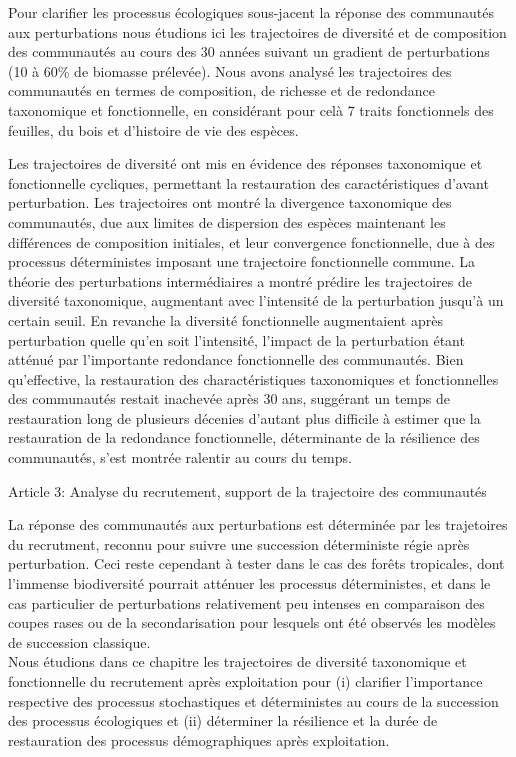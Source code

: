 \documentclass[
  11pt,
  french,
  A4paper,
  extrafontsizes,onecolumn,openright
  ]{memoir}
\begin{document}
Pour clarifier les processus écologiques sous-jacent la réponse des
communautés aux perturbations nous étudions ici les trajectoires de
diversité et de composition des communautés au cours des 30 années
suivant un gradient de perturbations (10 à 60\% de biomasse prélevée).
Nous avons analysé les trajectoires des communautés en termes de
composition, de richesse et de redondance taxonomique et fonctionnelle,
en considérant pour celà 7 traits fonctionnels des feuilles, du bois et
d'histoire de vie des espèces.

Les trajectoires de diversité ont mis en évidence des réponses
taxonomique et fonctionnelle cycliques, permettant la restauration des
caractéristiques d'avant perturbation. Les trajectoires ont montré la
divergence taxonomique des communautés, due aux limites de dispersion
des espèces maintenant les différences de composition initiales, et leur
convergence fonctionnelle, due à des processus déterministes imposant
une trajectoire fonctionnelle commune. La théorie des perturbations
intermédiaires a montré prédire les trajectoires de diversité
taxonomique, augmentant avec l'intensité de la perturbation jusqu'à un
certain seuil. En revanche la diversité fonctionnelle augmentaient après
perturbation quelle qu'en soit l'intensité, l'impact de la perturbation
étant atténué par l'importante redondance fonctionnelle des communautés.
Bien qu'effective, la restauration des charactéristiques taxonomiques et
fonctionnelles des communautés restait inachevée après 30 ans, suggérant
un temps de restauration long de plusieurs décenies d'autant plus
difficile à estimer que la restauration de la redondance fonctionnelle,
déterminante de la résilience des communautés, s'est montrée ralentir au
cours du temps.

Article 3: Analyse du recrutement, support de la trajectoire des
communautés

La réponse des communautés aux perturbations est déterminée par les
trajetoires du recrutment, reconnu pour suivre une succession
déterministe régie après perturbation. Ceci reste cependant à tester
dans le cas des forêts tropicales, dont l'immense biodiversité pourrait
atténuer les processus déterministes, et dans le cas particulier de
perturbations relativement peu intenses en comparaison des coupes rases
ou de la secondarisation pour lesquels ont été observés les modèles de
succession classique.\\
Nous étudions dans ce chapitre les trajectoires de diversité taxonomique
et fonctionnelle du recrutement après exploitation pour (i) clarifier
l'importance respective des processus stochastiques et déterministes au
cours de la succession des processus écologiques et (ii) déterminer la
résilience et la durée de restauration des processus démographiques
après exploitation.
\end{document}
